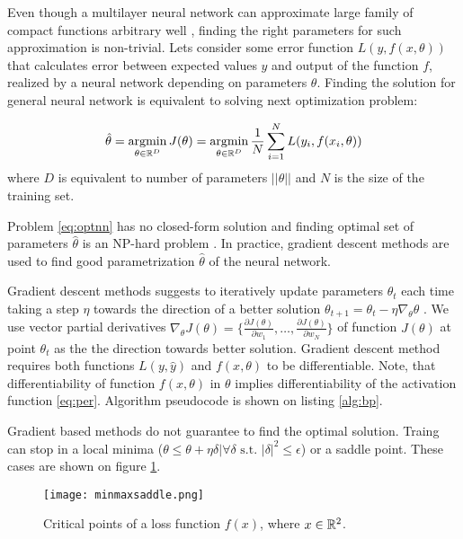 Even though a multilayer neural network can approximate large family of compact functions arbitrary well \cite{Debao1993}, finding the right parameters for such approximation is non-trivial.
Lets consider some error function $L(y, f(x, \theta))$ that calculates error between expected values $y$ and output of the function $f$, realized by a neural network depending on parameters $\theta$. Finding the solution for general neural network is equivalent to solving next optimization problem:

\begin{equation}\label{eq:optnn}
  \hat{\theta} = \operatorname*{argmin}_{\theta \in \Bbb{R}^D} J(\theta) = \operatorname*{argmin}_{\theta \in \Bbb{R}^D} \frac{1}{N} \sum_{i=1}^{N} L(y_i, f(x_i, \theta))
\end{equation}
where $D$ is equivalent to number of parameters $||\theta||$ and $N$ is the size of the training set.

Problem \ref{eq:optnn} has no closed-form solution and finding optimal set of parameters $\hat{\theta}$ is an NP-hard problem \cite{Anandkumar16}.
In practice, gradient descent methods are used to find good parametrization $\hat{\theta}$ of the neural network.

Gradient descent methods suggests to iteratively update parameters $\theta_t$ each time taking a step $\eta$ towards the direction of a better solution $\theta_{t+1}=\theta_t - \eta \nabla_\theta \theta$ \cite{Cauchy1847}.
We use vector partial derivatives $\nabla_\theta J(\theta)=\{ \frac{\partial J(\theta)}{\partial w_1}, \ldots, \frac{\partial J(\theta)}{\partial w_N} \}$ of function $J(\theta)$ at point $\theta_t$ as the the direction towards better solution. Gradient descent method requires both functions $L(y, \hat{y})$ and $f(x, \theta)$ to be differentiable. Note, that differentiability of function $f(x, \theta)$ in $\theta$ implies differentiability of the activation function \ref{eq:per}. Algorithm pseudocode is shown on listing \ref{alg:bp}.



Gradient based methods do not guarantee to find the optimal solution.
Traing can stop in a local minima ($\theta \leq \theta + \eta \delta | \forall \delta \text{ s.t. } |\delta|^2 \leq \epsilon$) or a saddle point.
These cases are shown on figure \ref{fig:critical}.

\begin{figure}[h!]
  \centering
    \texttt{[image: minmaxsaddle.png]}
  \caption{Critical points of a loss function $f(x)$, where $x \in \Bbb{R}^2$.}
  \label{fig:critical}
\end{figure}


